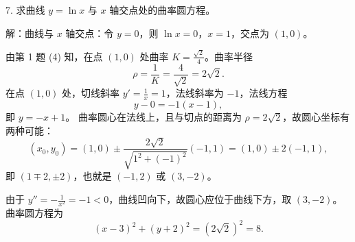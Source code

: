7. 求曲线 \(y=\ln x\) 与 \(x\) 轴交点处的曲率圆方程。

解：曲线与 \(x\) 轴交点：令 \(y=0\)，则 \(\ln x=0\)，\(x=1\)，交点为 \((1,0)\)。

由第 1 题 (4) 知，在点 \((1,0)\) 处曲率 \(K=\frac{\sqrt{2}}{4}\)。曲率半径
\[ \rho=\frac{1}{K}=\frac{4}{\sqrt{2}}=2\sqrt{2}. \]
在点 \((1,0)\) 处，切线斜率 \(y'=\frac{1}{x}=1\)，法线斜率为 \(-1\)，法线方程
\[ y-0=-1(x-1), \]
即 \(y=-x+1\)。
曲率圆心在法线上，且与切点的距离为 \(\rho=2\sqrt{2}\)，故圆心坐标有两种可能：
\[ (x_0,y_0)=(1,0)\pm\frac{2\sqrt{2}}{\sqrt{1^{2}+(-1)^{2}}}(-1,1)=(1,0)\pm 2(-1,1), \]
即 \((1\mp 2,\pm 2)\)，也就是 \((-1,2)\) 或 \((3,-2)\)。

由于 \(y''=-\frac{1}{x^{2}}=-1<0\)，曲线凹向下，故圆心应位于曲线下方，取 \((3,-2)\)。曲率圆方程为
\[ (x-3)^{2}+(y+2)^{2}=(2\sqrt{2})^{2}=8. \]
